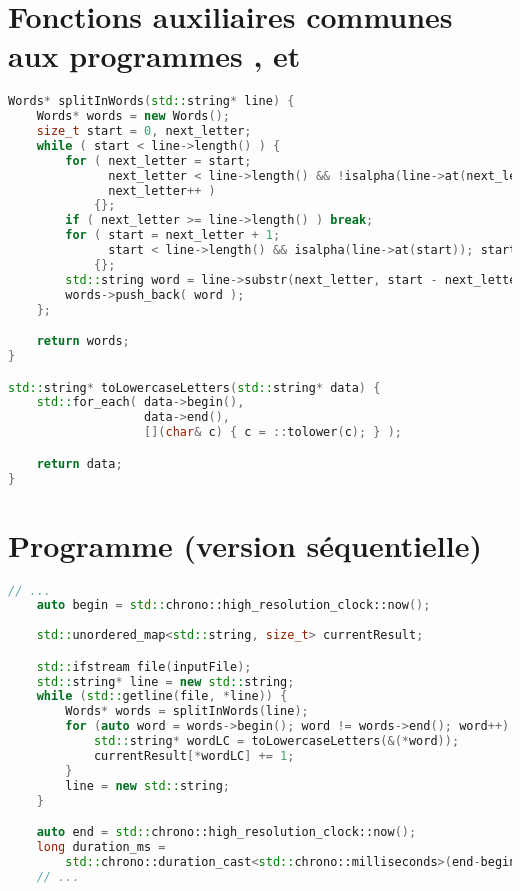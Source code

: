 \newpage
\section{Fonctions auxiliaires communes aux programmes ,
 et }

\begin{lstlisting}[basicstyle=\ttfamily\footnotesize,language=c++]
Words* splitInWords(std::string* line) {
    Words* words = new Words();
    size_t start = 0, next_letter;
    while ( start < line->length() ) {
        for ( next_letter = start;
              next_letter < line->length() && !isalpha(line->at(next_letter));
              next_letter++ )
            {};
        if ( next_letter >= line->length() ) break;
        for ( start = next_letter + 1;
              start < line->length() && isalpha(line->at(start)); start++ )
            {};
        std::string word = line->substr(next_letter, start - next_letter); 
        words->push_back( word );
    };

    return words;
}

std::string* toLowercaseLetters(std::string* data) {
    std::for_each( data->begin(),
                   data->end(),
                   [](char& c) { c = ::tolower(c); } );

    return data;
}
\end{lstlisting}


\newpage
\section{Programme  (version séquentielle)}
\begin{lstlisting}[gobble=4,basicstyle=\ttfamily\footnotesize,language=c++]
	// ...
	auto begin = std::chrono::high_resolution_clock::now();
	
    std::unordered_map<std::string, size_t> currentResult;

    std::ifstream file(inputFile);
    std::string* line = new std::string;
    while (std::getline(file, *line)) {
        Words* words = splitInWords(line);
        for (auto word = words->begin(); word != words->end(); word++) {
            std::string* wordLC = toLowercaseLetters(&(*word));
            currentResult[*wordLC] += 1;
        }
        line = new std::string;
    }

    auto end = std::chrono::high_resolution_clock::now();
    long duration_ms = 
        std::chrono::duration_cast<std::chrono::milliseconds>(end-begin).count();
	// ...
\end{lstlisting}

